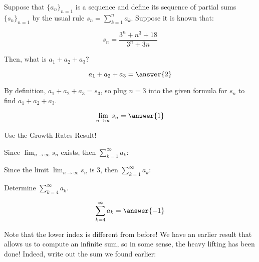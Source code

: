 \documentclass{ximera}
\author{Jim Talamo}
\begin{document}
\begin{exercise}
Suppose that $\{a_n\}_{n=1}$ is a sequence and define its sequence of partial sums $\{s_n\}_{n=1}$ by the usual rule $s_n = \sum_{k=1}^n a_k$.  Suppose it is known that:

\[
s_n = \frac{3^n+n^3+18}{3^n+3n}
\]

Then, what is $a_1+a_2+a_3$?

\[
a_1+a_2+a_3 = \answer{2}
\]
\begin{hint}
By definition, $a_1+a_2+a_3 = s_3$, so plug $n=3$ into the given formula for $s_n$ to find $a_1+a_2+a_3$.
\end{hint}
\begin{exercise}
\[
\lim_{n \to \infty} s_n = \answer{1}
\]
\begin{hint}
Use the Growth Rates Result!
\end{hint}
\begin{exercise}
Since $\lim_{n \to \infty} s_n$ exists, then $\sum_{k=1}^{\infty} a_k$:


\begin{multipleChoice}
\end{multipleChoice}

Since the limit $\lim_{n \to \infty} s_n$ is $3$, then $\sum_{k=1}^{\infty} a_k$:
\begin{multipleChoice}
\end{multipleChoice}

\begin{exercise}
Determine $\sum_{k=4}^{\infty} a_k$.

\[
\sum_{k=4}^{\infty} a_k = \answer{-1}
\]

\begin{hint}
Note that the lower index is different from before!  We have an earlier result that allows us to compute an infinite sum, so in some sense, the heavy lifting has been done!  Indeed, write out the sum we found earlier:
\begin{image}
  \end{image}
\end{hint}


\end{exercise}
\end{exercise}
\end{exercise}
\end{exercise}
\end{document}
